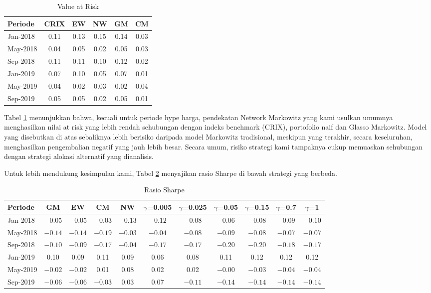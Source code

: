 \documentclass[12pt,a4paper]{article}
\begin{document}
\begin{table}[H]
\centering
\caption{Value at Risk}
\label{tab:var}
\begin{tabular}{lccccc}
\toprule
Periode & CRIX & EW & NW & GM & CM \\
\midrule
Jan-2018 & 0.11 & 0.13 & 0.15 & 0.14 & 0.03 \\
May-2018 & 0.04 & 0.05 & 0.02 & 0.05 & 0.03 \\
Sep-2018 & 0.11 & 0.11 & 0.10 & 0.12 & 0.02 \\
Jan-2019 & 0.07 & 0.10 & 0.05 & 0.07 & 0.01 \\
May-2019 & 0.04 & 0.02 & 0.03 & 0.02 & 0.04 \\
Sep-2019 & 0.05 & 0.05 & 0.02 & 0.05 & 0.01 \\
\bottomrule
\end{tabular}
\end{table}

Tabel \ref{tab:var} menunjukkan bahwa, kecuali untuk periode hype harga, pendekatan Network Markowitz yang kami usulkan umumnya menghasilkan nilai at risk yang lebih rendah sehubungan dengan indeks benchmark (CRIX), portofolio naif dan Glasso Markowitz. Model yang disebutkan di atas sebaliknya lebih berisiko daripada model Markowitz tradisional, meskipun yang terakhir, secara keseluruhan, menghasilkan pengembalian negatif yang jauh lebih besar. Secara umum, risiko strategi kami tampaknya cukup memuaskan sehubungan dengan strategi alokasi alternatif yang dianalisis.

Untuk lebih mendukung kesimpulan kami, Tabel \ref{tab:sharpe} menyajikan rasio Sharpe di bawah strategi yang berbeda.

\begin{table}[H]
\centering
\caption{Rasio Sharpe}
\label{tab:sharpe}
\begin{tabular}{lcccccccccc}
\toprule
Periode & GM & EW & CM & NW & $\gamma$=0.005 & $\gamma$=0.025 & $\gamma$=0.05 & $\gamma$=0.15 & $\gamma$=0.7 & $\gamma$=1 \\
\midrule
Jan-2018 & $-0.05$ & $-0.05$ & $-0.03$ & $-0.13$ & $-0.12$ & $-0.08$ & $-0.06$ & $-0.08$ & $-0.09$ & $-0.10$ \\
May-2018 & $-0.14$ & $-0.14$ & $-0.19$ & $-0.03$ & $-0.04$ & $-0.08$ & $-0.09$ & $-0.08$ & $-0.07$ & $-0.07$ \\
Sep-2018 & $-0.10$ & $-0.09$ & $-0.17$ & $-0.04$ & $-0.17$ & $-0.17$ & $-0.20$ & $-0.20$ & $-0.18$ & $-0.17$ \\
Jan-2019 & 0.10 & 0.09 & 0.11 & 0.09 & 0.06 & 0.08 & 0.11 & 0.12 & 0.12 & 0.12 \\
May-2019 & $-0.02$ & $-0.02$ & 0.01 & 0.08 & 0.02 & 0.02 & $-0.00$ & $-0.03$ & $-0.04$ & $-0.04$ \\
Sep-2019 & $-0.06$ & $-0.06$ & $-0.03$ & 0.03 & 0.07 & $-0.11$ & $-0.14$ & $-0.14$ & $-0.14$ & $-0.14$ \\
\bottomrule
\end{tabular}
\end{table}
\end{document}
